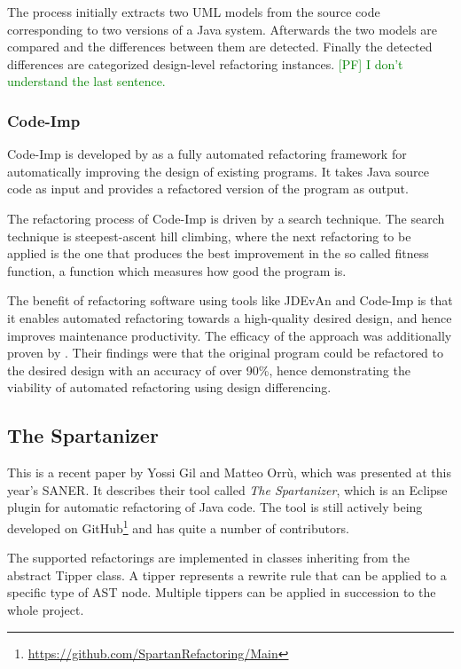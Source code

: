 \documentclass[conference,compsoc,a4paper]{IEEEtran}
\newcommand{\code}[1]{{\small\ttfamily #1}}
\newcommand{\pf}[1]{\textcolor{green}{[PF] #1}}
\begin{document}
The process initially extracts two UML models from the source code corresponding to two versions of a Java system. 
Afterwards the two models are compared and the differences between them are detected. Finally the detected differences 
are categorized	design-level refactoring instances. \pf{I don't understand the last sentence.}

\subsubsection{Code-Imp}

Code-Imp is developed by \cite{DBLP:journals/jss/OKeeffeC08, DBLP:conf/icse/MoghadamC11} as a fully automated 
refactoring framework for automatically improving the design of existing programs. It takes Java source code as input 
and provides a refactored version of the program as output.

The refactoring process of Code-Imp is driven by a search technique. The search technique is steepest-ascent 
hill climbing, where the next refactoring to be applied is the one that produces the best improvement in the so called 
fitness function, a function which measures how good the program is.

The benefit of refactoring software using tools like JDEvAn and Code-Imp is that it enables automated refactoring 
towards a high-quality desired design, and hence improves maintenance productivity. The efficacy of the approach was 
additionally proven by \cite{design-diff}. Their findings were that the original program could be refactored to the 
desired design with an accuracy of over 90\%, hence	demonstrating the viability of automated refactoring using design 
differencing.

\subsection{The Spartanizer}

This is a recent paper by Yossi Gil and Matteo Orrù, which was presented at this year's SANER. It describes their tool 
called \emph{The Spartanizer}, which is an Eclipse plugin for automatic refactoring of Java code. The tool is still 
actively being developed on GitHub\footnote{\url{https://github.com/SpartanRefactoring/Main}} and has quite a number of 
contributors.

The supported refactorings are implemented in classes inheriting from the abstract \code{Tipper} class. A tipper 
represents a rewrite rule that can be applied to a specific type of AST node. Multiple tippers can be applied in 
succession to the whole project.
\end{document}
